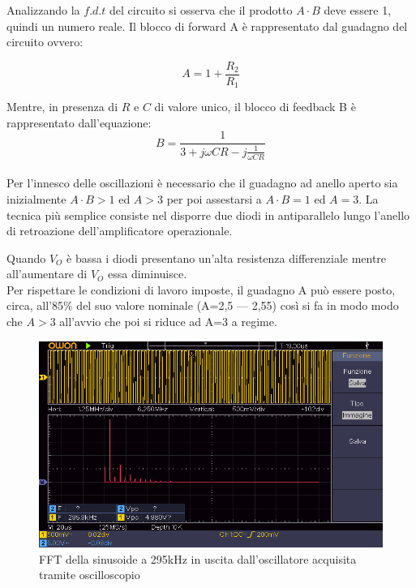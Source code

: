 \documentclass[titlepage]{report}
\begin{document}
	\noindent Analizzando la $f.d.t$ del circuito si osserva che il prodotto $A\cdot B$ deve essere 1, quindi un numero reale.
	Il blocco di forward A è rappresentato dal guadagno del circuito ovvero: 

	\begin{equation}
		\label{eq:LF356_Gain}
		A = 1 + \frac{R_2}{R_1}
	\end{equation}


	Mentre, in presenza di $R$ e $C$ di valore unico, il blocco di feedback B è rappresentato dall'equazione:
	\\
	\begin{equation}
		\label{eq:LF356_Feedback}
		B = \frac{1}{3 + j\omega C R - j\frac{1}{\omega C R}}
	\end{equation}
	\\
	Per l'innesco delle oscillazioni è necessario che il guadagno ad anello aperto sia inizialmente $A\cdot B>1$ ed $A>3$ per poi assestarsi a $A\cdot B=1$ ed $A=3$. La tecnica più semplice consiste nel disporre due diodi in antiparallelo lungo l'anello di retroazione dell'amplificatore operazionale.
	
	\noindent Quando \textit{$V_{O}$} è bassa i diodi presentano un'alta resistenza differenziale mentre all'aumentare di \textit{$V_{O}$} essa diminuisce. 
	\\ Per rispettare le condizioni di lavoro imposte, il guadagno A può essere posto, circa, all'85\% del suo valore nominale (A=2,5 — 2,55) così si fa in modo modo che $A>3$ all'avvio che poi si riduce ad A=3 a regime.

	\begin{figure}[H]
		\centering
		\includegraphics[scale=0.9]{Immagini/009_OscillatoreWienFFT.png}
		\caption{FFT della sinusoide a 295kHz in uscita dall'oscillatore acquisita tramite oscilloscopio}
		\label{fig:FFT295k}
	\end{figure}
	
\end{document}
